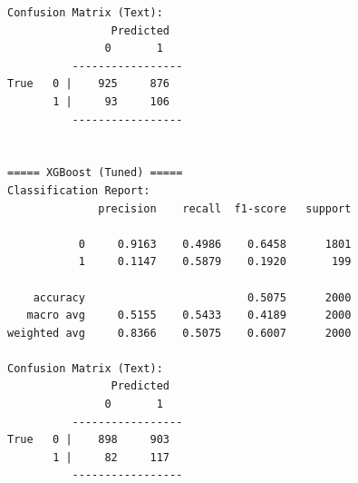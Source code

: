 \begin{lstlisting}[caption={Output 2}]
Confusion Matrix (Text):
                Predicted
               0       1
          -----------------
True   0 |    925     876
       1 |     93     106
          -----------------


===== XGBoost (Tuned) =====
Classification Report:
              precision    recall  f1-score   support

           0     0.9163    0.4986    0.6458      1801
           1     0.1147    0.5879    0.1920       199

    accuracy                         0.5075      2000
   macro avg     0.5155    0.5433    0.4189      2000
weighted avg     0.8366    0.5075    0.6007      2000

Confusion Matrix (Text):
                Predicted
               0       1
          -----------------
True   0 |    898     903
       1 |     82     117
          -----------------
\end{lstlisting}

